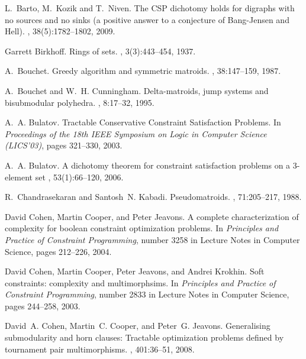 \documentclass[11pt,onecolumn]{article}
\begin{document}
\small

\begin{thebibliography}{10}

L.~Barto, M.~Kozik and T.~Niven.
\newblock The {C}{S}{P} dichotomy holds for digraphs with
  no sources and no sinks (a positive answer to a conjecture of {B}ang-{J}ensen
  and {H}ell).
, 38(5):1782--1802, 2009.

Garrett Birkhoff.
\newblock Rings of sets.
, 3(3):443--454, 1937.

A.~Bouchet.
\newblock Greedy algorithm and symmetric matroids.
, 38:147--159, 1987.

A.~Bouchet and W.~H. Cunningham.
\newblock Delta-matroids, jump systems and bisubmodular polyhedra.
, 8:17--32, 1995.

A.~A. Bulatov.
\newblock Tractable {C}onservative {C}onstraint {S}atisfaction {P}roblems.
\newblock In {\em Proceedings of the 18th {I}{E}{E}{E} {S}ymposium on {L}ogic in {C}omputer
  {S}cience ({L}{I}{C}{S}'03)}, pages 321--330, 2003.

A.~A. Bulatov.
\newblock A dichotomy theorem for constraint satisfaction problems on a
  3-element set
, 53(1):66--120, 2006.

R.~Chandrasekaran and Santosh~N. Kabadi.
\newblock Pseudomatroids.
, 71:205--217, 1988.

David Cohen, Martin Cooper, and Peter Jeavons.
\newblock A complete characterization of complexity for boolean constraint
  optimization problems.
\newblock In {\em Principles and Practice of Constraint Programming}, number
  3258 in Lecture Notes in Computer Science, pages 212--226, 2004.

David Cohen, Martin Cooper, Peter Jeavons, and Andrei Krokhin.
\newblock Soft constraints: complexity and multimorphsims.
\newblock In {\em Principles and Practice of Constraint Programming}, number
  2833 in Lecture Notes in Computer Science, pages 244--258, 2003.

David~A. Cohen, Martin~C. Cooper, and Peter~G. Jeavons.
\newblock Generalising submodularity and horn clauses: Tractable optimization
  problems defined by tournament pair multimorphisms.
, 401:36--51, 2008.


\end{thebibliography}
\end{document}
